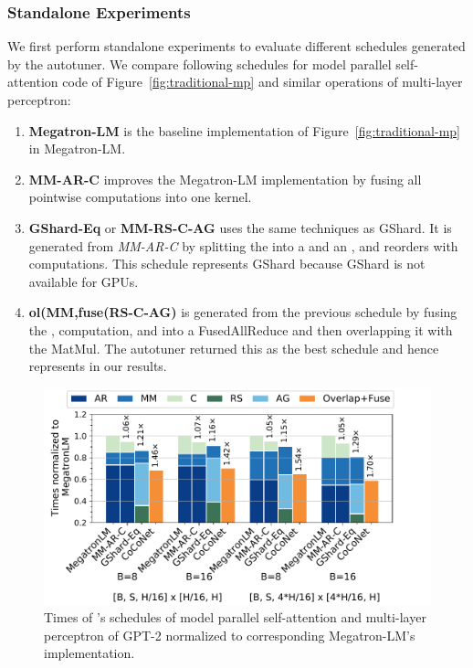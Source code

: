 \subsubsection{Standalone Experiments}
We first perform standalone experiments to evaluate different schedules generated by the autotuner.
We compare following schedules for model parallel self-attention code of Figure~\ref{fig:traditional-mp} and similar operations of multi-layer perceptron:
\begin{enumerate}[leftmargin=*,topsep=2pt]
  \item \textbf{Megatron-LM} is the baseline implementation of Figure~\ref{fig:traditional-mp} in Megatron-LM.
  \item \textbf{MM-AR-C} improves the Megatron-LM implementation by fusing all pointwise computations into one kernel.
  \item \textbf{GShard-Eq} or \textbf{MM-RS-C-AG} uses the same techniques as GShard. It is generated from \textit{MM-AR-C} by splitting the \allreduce into a \reducescatter and an \allgather, and reorders \allgather with computations. 
  This schedule represents GShard because GShard is not available for GPUs.
  \item \textbf{ol(MM,fuse(RS-C-AG)} is generated from the previous schedule by fusing the \reducescatter, computation, and \allgather into a FusedAllReduce and then overlapping it with the MatMul. 
  The autotuner returned this as the best schedule and hence represents \tool in our results.
\end{enumerate}
\begin{figure}[t]
	\centering
  \includegraphics[width=\linewidth]{figures/matmul-overlap-16-gpus_combined.pdf}
  \caption{Times of \tool's schedules of model parallel self-attention and multi-layer perceptron of GPT-2 normalized to corresponding Megatron-LM's implementation.
  \label{fig:matmul-overlap}}
\end{figure}

